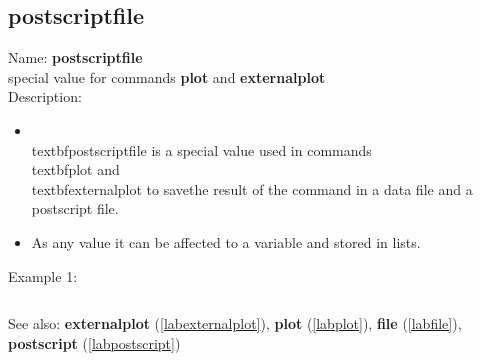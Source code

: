\subsection{postscriptfile}
\label{labpostscriptfile}
\noindent Name: \textbf{postscriptfile}\\
special value for commands \textbf{plot} and \textbf{externalplot}\\
\noindent Description: \begin{itemize}

\item \\textbf{postscriptfile} is a special value used in commands \\textbf{plot} and \\textbf{externalplot} to save\n   the result of the command in a data file and a postscript file.\n
\item As any value it can be affected to a variable and stored in lists.\n\end{itemize}
\noindent Example 1: 
\begin{center}\begin{minipage}{15cm}\begin{Verbatim}[frame=single]
\end{Verbatim}
\end{minipage}\end{center}
See also: \textbf{externalplot} (\ref{labexternalplot}), \textbf{plot} (\ref{labplot}), \textbf{file} (\ref{labfile}), \textbf{postscript} (\ref{labpostscript})
